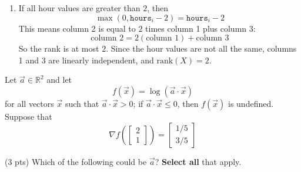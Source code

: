 \documentclass[11pt]{article}
\begin{document}
\begin{prob}
\begin{subprob}
\begin{solution}
\begin{enumerate}[label=(\roman*)]
    \item If all hour values are greater than $2$, then
    \[
    \max(0,\texttt{hours}_i-2)=\texttt{hours}_i-2
    \]
    This means column 2 is equal to $2$ times column 1 plus column 3:
    \[
    \text{column 2}=2(\text{column 1})+\text{column 3}
    \]
    So the rank is at most $2$. Since the hour values are not all the same, columns 1 and 3 are linearly independent, and $\text{rank}(X)=2$.
\end{enumerate}
\end{solution}
\end{subprob}

\end{prob}

\newpage

\begin{prob}
Let $\vec a \in \mathbb{R}^2$ and let
\[
f(\vec x) = \log(\vec a \cdot \vec x)
\]
for all vectors $\vec x$ such that $\vec a \cdot \vec x > 0$; if $\vec a \cdot \vec x \leq 0$, then $f(\vec x)$ is undefined. Suppose that
\[
\nabla f\left(\begin{bmatrix}2\\1\end{bmatrix}\right)
=
\begin{bmatrix}1/5\\3/5\end{bmatrix}
\]

\begin{subprob}(3 pts)
Which of the following could be $\vec a$? \textbf{Select all} that apply.



\end{subprob}
\end{prob}
\end{document}
